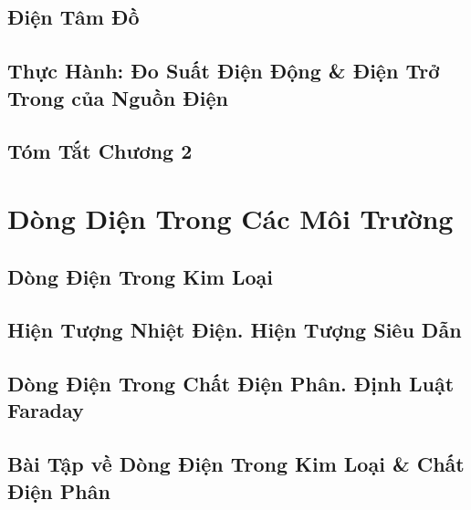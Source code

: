 \documentclass[oneside]{book}
\numberwithin{equation}{section}
\begin{document}

\section{Điện Tâm Đồ}


\section{Thực Hành: Đo Suất Điện Động \& Điện Trở Trong của Nguồn Điện}


\section{Tóm Tắt Chương 2}


\chapter{Dòng Diện Trong Các Môi Trường}

\section{Dòng Điện Trong Kim Loại}


\section{Hiện Tượng Nhiệt Điện. Hiện Tượng Siêu Dẫn}


\section{Dòng Điện Trong Chất Điện Phân. Định Luật Faraday}


\section{Bài Tập về Dòng Điện Trong Kim Loại \& Chất Điện Phân}
\end{document}
